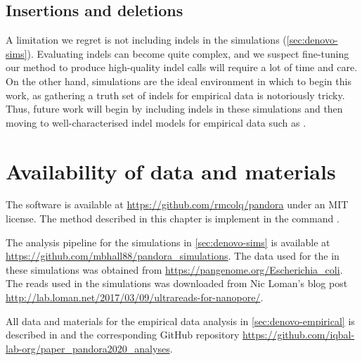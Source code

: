 \subsection{Insertions and deletions}

A limitation we regret is not including indels in the simulations (\autoref{sec:denovo-sims}). Evaluating indels can become quite complex, and we suspect fine-tuning our method to produce high-quality indel calls will require a lot of time and care. On the other hand, simulations are the ideal environment in which to begin this work, as gathering a truth set of indels for empirical data is notoriously tricky. Thus, future work will begin by including indels in these simulations and then moving to well-characterised indel models for empirical data such as \cite{Bush2021}.

\section{Availability of data and materials}

The \pandora{} software is available at \url{https://github.com/rmcolq/pandora} under an MIT license. The \denovo{} method described in this chapter is implement in the command \pandora{} .

The analysis pipeline for the simulations in \autoref{sec:denovo-sims} is available at \url{https://github.com/mbhall88/pandora_simulations}. The data used for the \panrg{} in these simulations was obtained from \url{https://pangenome.org/Escherichia_coli}. The \ont{} reads used in the simulations was downloaded from Nic Loman's blog post \url{http://lab.loman.net/2017/03/09/ultrareads-for-nanopore/}.

All data and materials for the empirical data analysis in \autoref{sec:denovo-empirical} is described in \cite{pandora} and the corresponding GitHub repository \url{https://github.com/iqbal-lab-org/paper_pandora2020_analyses}.
